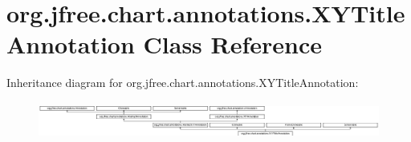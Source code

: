\hypertarget{classorg_1_1jfree_1_1chart_1_1annotations_1_1_x_y_title_annotation}{}\section{org.\+jfree.\+chart.\+annotations.\+X\+Y\+Title\+Annotation Class Reference}
\label{classorg_1_1jfree_1_1chart_1_1annotations_1_1_x_y_title_annotation}
Inheritance diagram for org.\+jfree.\+chart.\+annotations.\+X\+Y\+Title\+Annotation\+:\begin{figure}[H]
\begin{center}
\leavevmode
\includegraphics[height=1.248607cm]{classorg_1_1jfree_1_1chart_1_1annotations_1_1_x_y_title_annotation}
\end{center}
\end{figure}
